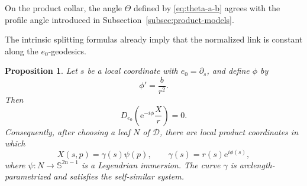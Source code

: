 \documentclass[11pt,a4paper]{article}
\numberwithin{equation}{section}
\newtheorem{proposition}[theorem]{Proposition}
\newcommand{\Sph}{\mathbb S}
\newcommand{\Dcal}{\mathcal D}
\newcommand{\ee}{\mathrm e}
\begin{document}
On the product collar, the angle $\Theta$ defined by \eqref{eq:theta-a-b} agrees with the profile angle introduced in Subsection~\ref{subsec:product-models}.

The intrinsic splitting formulas already imply that the normalized link is constant along the $e_0$-geodesics.

\begin{proposition}\label{prop:local-reconstruction}
Let $s$ be a local coordinate with $e_0=\partial_s$, and define $\phi$ by
\begin{equation}\label{eq:phi-prime-intrinsic}
        \phi'=\frac{b}{r^2}.
\end{equation}
Then
\begin{equation}\label{eq:normalized-link-parallel}
        D_{e_0}\left(\ee^{-i\phi}\frac{X}{r}\right)=0.
\end{equation}
Consequently, after choosing a leaf $N$ of $\Dcal$, there are local product coordinates in which
\begin{equation}\label{eq:local-product-reconstruction}
        X(s,p)=\gamma(s)\psi(p),
        \qquad
        \gamma(s)=r(s)\ee^{i\phi(s)},
\end{equation}
where $\psi:N\to\Sph^{2n-1}$ is a Legendrian immersion.  The curve $\gamma$ is arclength-parametrized and satisfies the self-similar system.
\end{proposition}
\end{document}
